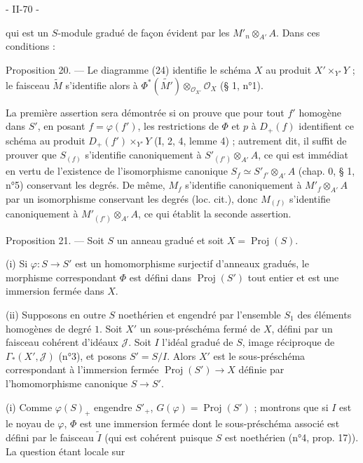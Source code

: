 \newpage


- II-70 -

qui est un $S$-module gradué de façon évident par les $M'_n \otimes_{A'} A$. Dans ces conditions :

Proposition 20. — Le diagramme (24) identifie le schéma $X$ au produit $X' \times_{Y'} Y$ ; le faisceau $\widetilde{M}$ s'identifie alors à $\Phi^* (\widetilde{M'}) \otimes_{\mathcal{O}_{X'}} \mathcal{O}_X$ (§ 1, n°1).

La première assertion sera démontrée si on prouve que pour tout $f'$ homogène dans $S'$, en posant $f = \varphi(f')$, les restrictions de $\Phi$ et $p$ à $D_+(f)$ identifient ce schéma au produit $D_+(f') \times_{Y'} Y$ (I, 2, 4, lemme 4) ; autrement dit, il suffit de prouver que $S_{(f)}$ s'identifie canoniquement à $S'_{(f')} \otimes_{A'} A$, ce qui est immédiat en vertu de l'existence de l'isomorphisme canonique $S_f \simeq S'_{f'} \otimes_{A'} A$ (chap. 0, § 1, n°5) conservant les degrés. De même, $M_f$ s'identifie canoniquement à $M'_f \otimes_{A'} A$ par un isomorphisme conservant les degrés (loc. cit.), donc $M_{(f)}$ s'identifie canoniquement à $M'_{(f')} \otimes_{A'} A$, ce qui établit la seconde assertion.

Proposition 21. — Soit $S$ un anneau gradué et soit $X = \operatorname{Proj}(S)$.

(i) Si $\varphi : S \to S'$ est un homomorphisme surjectif d'anneaux gradués, le morphisme correspondant $\Phi$ est défini dans $\operatorname{Proj}(S')$ tout entier et est une immersion fermée dans $X$.

(ii) Supposons en outre $S$ noethérien et engendré par l'ensemble $S_1$ des éléments homogènes de degré $1$. Soit $X'$ un sous-préschéma fermé de $X$, défini par un faisceau cohérent d'idéaux $\mathcal{J}$. Soit $I$ l'idéal gradué de $S$, image réciproque de $\Gamma_*(X', \mathcal{J})$ (n°3), et posons $S' = S/I$. Alors $X'$ est le sous-préschéma correspondant à l'immersion fermée $\operatorname{Proj}(S') \to X$ définie par l'homomorphisme canonique $S \to S'$.

(i) Comme $\varphi(S)_+$ engendre $S'_+$, $G(\varphi) = \operatorname{Proj}(S')$ ; montrons que si $I$ est le noyau de $\varphi$, $\Phi$ est une immersion fermée dont le sous-préschéma associé est défini par le faisceau $\widetilde{I}$ (qui est cohérent puisque $S$ est noethérien (n°4, prop. 17)). La question étant locale sur

\newpage

